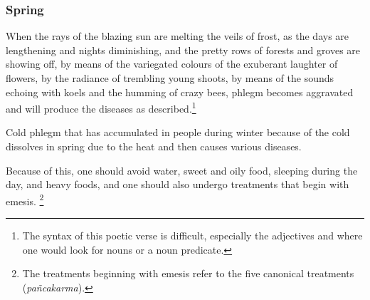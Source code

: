 \begin{translation}
\subsubsection{Spring}%

\item[36--38] %
When the rays of the blazing sun %
are melting %
the veils of frost, %
as the days are lengthening and nights diminishing, %
%
and the pretty  %
rows of forests and groves %
are showing off, %
by  means of the variegated colours of  %
the exuberant laughter of flowers, %
by the radiance of trembling young shoots, %
by means of the sounds %
echoing with koels %
and the humming of crazy bees, %
%
phlegm becomes aggravated %
and will produce %
the diseases as described.\footnote{The syntax of this poetic
verse is difficult, especially the adjectives  and  where one would look for nouns or a noun predicate.}

\item[39] %
Cold phlegm that has accumulated in people during winter because of the cold %
dissolves %
in spring due to the heat and then causes various diseases.

\item[40] 
Because of this, one should avoid water, sweet and oily food, sleeping during the day, and heavy foods, and one should also undergo treatments that begin with emesis.%
    \footnote{The treatments beginning with emesis refer to the five canonical treatments (\emph{pañcakarma}).}

\item[41--42] 


\end{translation}
